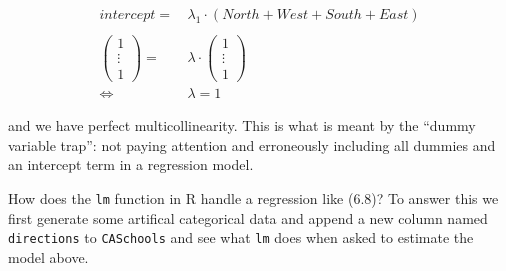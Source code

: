 \documentclass[]{book}
\newenvironment{Shaded}{\begin{snugshade}}{\end{snugshade}}
\newcommand{\KeywordTok}[1]{\textcolor[rgb]{0.13,0.29,0.53}{\textbf{#1}}}
\newcommand{\DataTypeTok}[1]{\textcolor[rgb]{0.13,0.29,0.53}{#1}}
\newcommand{\DecValTok}[1]{\textcolor[rgb]{0.00,0.00,0.81}{#1}}
\newcommand{\StringTok}[1]{\textcolor[rgb]{0.31,0.60,0.02}{#1}}
\newcommand{\CommentTok}[1]{\textcolor[rgb]{0.56,0.35,0.01}{\textit{#1}}}
\newcommand{\OperatorTok}[1]{\textcolor[rgb]{0.81,0.36,0.00}{\textbf{#1}}}
\newcommand{\NormalTok}[1]{#1}
\theoremstyle{definition}
\theoremstyle{definition}
\theoremstyle{definition}
\theoremstyle{remark}
\begin{document}
\begin{align}
  intercept = \, & \lambda_1 \cdot (North + West + South + East) \\
  \\
  \begin{pmatrix} 1 \\ \vdots \\ 1\end{pmatrix} = \, & \lambda \cdot \begin{pmatrix} 1 \\ \vdots \\ 1\end{pmatrix} \\   \Leftrightarrow \, & \lambda = 1
\end{align}

and we have perfect multicollinearity. This is what is meant by the
``dummy variable trap'': not paying attention and erroneously including
all dummies and an intercept term in a regression model.

How does the \texttt{lm} function in R handle a regression like (6.8)?
To answer this we first generate some artifical categorical data and
append a new column named \texttt{directions} to \texttt{CASchools} and
see what \texttt{lm} does when asked to estimate the model above.

\begin{Shaded}
\end{Shaded}
\end{document}
